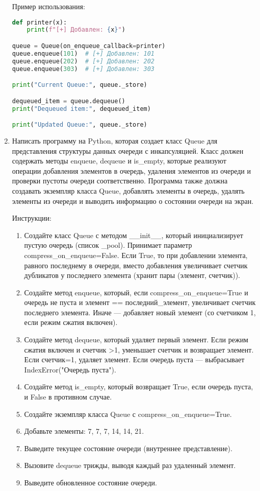 \begin{enumerate}
Пример использования:
\begin{lstlisting}[language=Python]
def printer(x):
    print(f"[+] Добавлен: {x}")

queue = Queue(on_enqueue_callback=printer)
queue.enqueue(101)  # [+] Добавлен: 101
queue.enqueue(202)  # [+] Добавлен: 202
queue.enqueue(303)  # [+] Добавлен: 303

print("Current Queue:", queue._store)

dequeued_item = queue.dequeue()
print("Dequeued item:", dequeued_item)

print("Updated Queue:", queue._store)
\end{lstlisting}

\item Написать программу на Python, которая создает класс Queue для представления структуры данных очереди с инкапсуляцией. Класс должен содержать методы enqueue, dequeue и is\_empty, которые реализуют операции добавления элементов в очередь, удаления элементов из очереди и проверки пустоты очереди соответственно. Программа также должна создавать экземпляр класса Queue, добавлять элементы в очередь, удалять элементы из очереди и выводить информацию о состоянии очереди на экран.

Инструкции:
\begin{enumerate}
    \item Создайте класс Queue с методом \_\_init\_\_, который инициализирует пустую очередь (список \_pool). Принимает параметр compress\_on\_enqueue=False. Если True, то при добавлении элемента, равного последнему в очереди, вместо добавления увеличивает счетчик дубликатов у последнего элемента (хранит пары (элемент, счетчик)).
    \item Создайте метод enqueue, который, если compress\_on\_enqueue=True и очередь не пуста и элемент == последний\_элемент, увеличивает счетчик последнего элемента. Иначе — добавляет новый элемент (со счетчиком 1, если режим сжатия включен).
    \item Создайте метод dequeue, который удаляет первый элемент. Если режим сжатия включен и счетчик >1, уменьшает счетчик и возвращает элемент. Если счетчик=1, удаляет элемент. Если очередь пуста — выбрасывает IndexError("Очередь пуста").
    \item Создайте метод is\_empty, который возвращает True, если очередь пуста, и False в противном случае.
    \item Создайте экземпляр класса Queue с compress\_on\_enqueue=True.
    \item Добавьте элементы: 7, 7, 7, 14, 14, 21.
    \item Выведите текущее состояние очереди (внутреннее представление).
    \item Вызовите dequeue трижды, выводя каждый раз удаленный элемент.
    \item Выведите обновленное состояние очереди.
\end{enumerate}


\end{enumerate}

